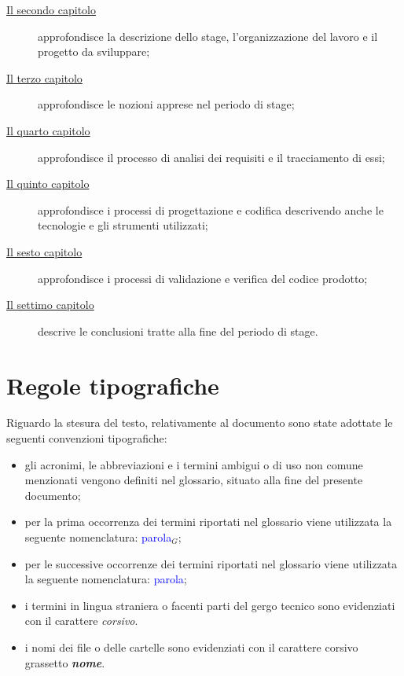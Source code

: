 \begin{description}
    \item[{\hyperref[cap:descrizione-stage]{Il secondo capitolo}}] approfondisce la descrizione dello stage, l'organizzazione del lavoro e il progetto da sviluppare;
    
    \item[{\hyperref[cap:nozioni-apprese]{Il terzo capitolo}}] approfondisce le nozioni apprese nel periodo di stage;
    
    \item[{\hyperref[cap:analisi-requisiti]{Il quarto capitolo}}] approfondisce il processo di analisi dei requisiti e il tracciamento di essi;
    
    \item[{\hyperref[cap:progettazione-codifica]{Il quinto capitolo}}] approfondisce i processi di progettazione e codifica descrivendo anche le tecnologie e gli strumenti utilizzati;
    
    \item[{\hyperref[cap:verifica-validazione]{Il sesto capitolo}}] approfondisce i processi di validazione e verifica del codice prodotto;
    
    \item[{\hyperref[cap:conclusioni]{Il settimo capitolo}}] descrive le conclusioni tratte alla fine del periodo di stage.
\end{description}

\section{Regole tipografiche}

Riguardo la stesura del testo, relativamente al documento sono state adottate le seguenti convenzioni tipografiche:
\begin{itemize}
	\item gli acronimi, le abbreviazioni e i termini ambigui o di uso non comune menzionati vengono definiti nel glossario, situato alla fine del presente documento;
	\item per la prima occorrenza dei termini riportati nel glossario viene utilizzata la seguente nomenclatura: \textcolor{blue}{parola}$_G$;
	\item per le successive occorrenze dei termini riportati nel glossario viene utilizzata la seguente nomenclatura: \textcolor{blue}{parola};
	\item i termini in lingua straniera o facenti parti del gergo tecnico sono evidenziati con il carattere \emph{corsivo}.
	\item i nomi dei file o delle cartelle sono evidenziati con il carattere corsivo grassetto \textbf{\textit{nome}}.
\end{itemize}